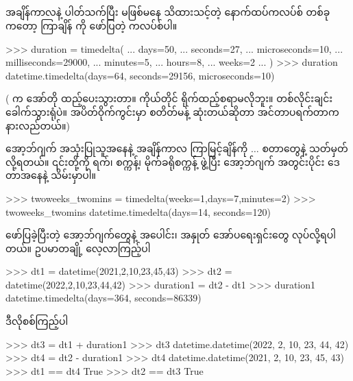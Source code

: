 \subsection*{}
အချိန်ကာလနဲ့ ပါတ်သက်ပြီး မဖြစ်မနေ သိထားသင့်တဲ့ နောက်ထပ်ကလပ်စ် တစ်ခုကတော့ ကြာချိန်  ကို ဖော်ပြတဲ့  ကလပ်စ်ပါ။
\begin{codetxt}
>>> duration = timedelta(
... days=50,
... seconds=27,
... microseconds=10,
... milliseconds=29000,
... minutes=5,
... hours=8,
... weeks=2
... )
>>> duration
datetime.timedelta(days=64, seconds=29156, microseconds=10)
\end{codetxt}
( က အော်တို ထည့်ပေးသွားတာ။ ကိုယ်တိုင် ရိုက်ထည့်စရာမလိုဘူး။ တစ်လိုင်းချင်း  ခေါက်သွားရုံပဲ။ အပိတ်ဝိုက်ကွင်းမှာ စတိတ်မန့် ဆုံးတယ်ဆိုတာ အင်တာပရက်တာက နားလည်တယ်။)

အော့ဘ်ဂျက် အသုံးပြုသူအနေနဲ့ အချိန်ကာလ ကြာမြင့်ချိန်ကို \fEn{,} \fEn{,}  $\ldots$ စတာတွေနဲ့ သတ်မှတ်လို့ရတယ်။ ၎င်းတို့ကို ရက်၊ စက္ကန့်၊ မိုက်ခရိုစက္ကန့် ဖွဲ့ပြီး အော့ဘ်ဂျက် အတွင်းပိုင်း \fEn{,} \fEn{,}    ဒေတာအနေနဲ့ သိမ်းမှာပါ။ 
\begin{codetxt}
>>> twoweeks_twomins = timedelta(weeks=1,days=7,minutes=2)
>>> twoweeks_twomins
datetime.timedelta(days=14, seconds=120)
\end{codetxt}

ဖော်ပြခဲ့ပြီးတဲ့ အော့ဘ်ဂျက်တွေနဲ့ အပေါင်း၊ အနှုတ် အော်ပရေးရှင်းတွေ လုပ်လို့ရပါတယ်။ ဥပမာတချို့ လေ့လာကြည့်ပါ
\begin{codetxt}
>>> dt1 = datetime(2021,2,10,23,45,43)
>>> dt2 = datetime(2022,2,10,23,44,42)
>>> duration1 = dt2 - dt1
>>> duration1
datetime.timedelta(days=364, seconds=86339)
\end{codetxt}
ဒီလိုစစ်ကြည့်ပါ
\begin{codetxt}
>>> dt3 = dt1 + duration1
>>> dt3
datetime.datetime(2022, 2, 10, 23, 44, 42)
>>> dt4 = dt2 - duration1
>>> dt4
datetime.datetime(2021, 2, 10, 23, 45, 43)
>>> dt1 == dt4
True
>>> dt2 == dt3
True
\end{codetxt}


